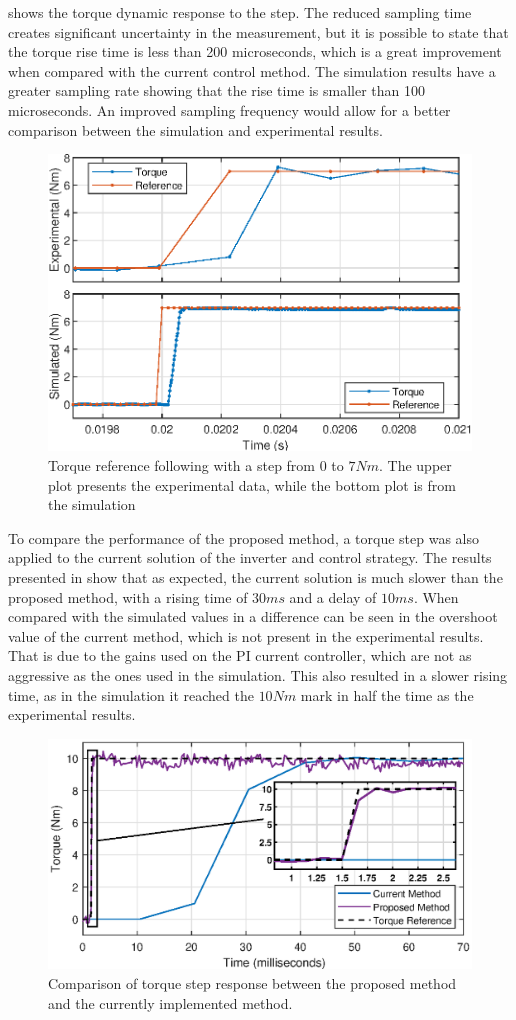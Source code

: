  shows the torque dynamic response to the step. The reduced sampling time creates significant uncertainty in the measurement, but it is possible to state that the torque rise time is less than 200 microseconds, which is a great improvement when compared with the current control method. The simulation results have a greater sampling rate showing that the rise time is smaller than 100 microseconds. An improved sampling frequency would allow for a better comparison between the simulation and experimental results.

\begin{figure}[!htb]
	\centering
	\includegraphics[width=0.55\linewidth]{Figures/Tq_step.eps}
	\caption[Torque reference following with a step from $0$ to $7Nm$.]{Torque reference following with a step from $0$ to $7Nm$. The upper plot presents the experimental data, while the bottom plot is from the simulation}
	\label{fig:tq_step_response_time} %
\end{figure}

To compare the performance of the proposed method, a torque step was also applied to the current solution of the inverter and control strategy. The results presented in  show that as expected, the current solution is much slower than the proposed method, with a rising time of $30ms$ and a delay of $10ms$. When compared with the simulated values in  a difference can be seen in the overshoot value of the current method, which is not present in the experimental results.  That is due to the gains used on the PI current controller, which are not as aggressive as the ones used in the simulation. This also resulted in a slower rising time, as in the simulation it reached the $10Nm$ mark in half the time as the experimental results.

\begin{figure}[!htb]
	\centering
	\includegraphics[width=0.7\linewidth]{Figures/Car_Tq_step.eps}
	\caption{Comparison of torque step response between the proposed method and the currently implemented method.}
	\label{fig:torque_step_comparison_FOC_MPC}%
\end{figure}

